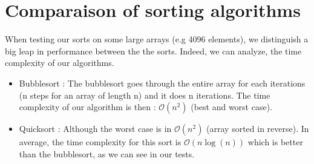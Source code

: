 \documentclass{article}
\begin{document}
\section{Comparaison of sorting algorithms}
When testing our sorts on some large arrays (e.g 4096 elements), we distinguish a big leap in performance between the the sorts. Indeed, we can analyze, 
the time complexity of our algorithms. 
\begin{itemize}
    \item Bubblesort : The bubblesort goes through the entire array for each iterations (n steps for an array of length n) and it does n iterations. The time complexity 
    of our algorithm is then : $\mathcal{O}(n^2)$ (best and worst case).
    \item Quicksort : Although the worst case is in $\mathcal{O}(n^2)$ (array sorted in reverse). In average, the time complexity for this sort is $\mathcal{O}(n\log(n))$ which is better than the bubblesort, 
    as we can see in our tests.
\end{itemize}
\end{document}
